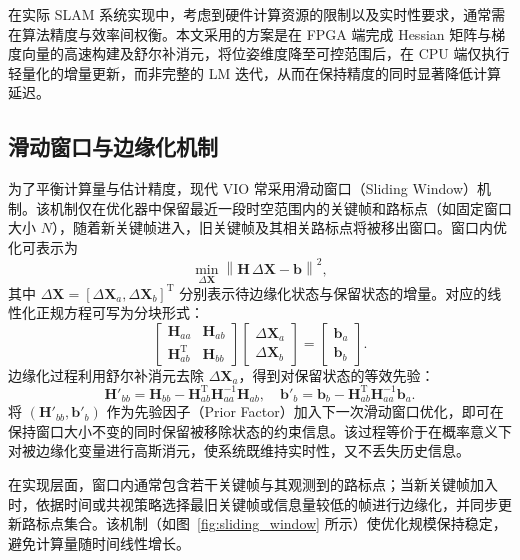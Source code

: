 在实际 SLAM 系统实现中，考虑到硬件计算资源的限制以及实时性要求，通常需在算法精度与效率间权衡。本文采用的方案是在 FPGA 端完成 Hessian 矩阵与梯度向量的高速构建及舒尔补消元，将位姿维度降至可控范围后，在 CPU 端仅执行轻量化的增量更新，而非完整的 LM 迭代，从而在保持精度的同时显著降低计算延迟。

\subsection{滑动窗口与边缘化机制}

为了平衡计算量与估计精度，现代 VIO 常采用滑动窗口（Sliding Window）机制。该机制仅在优化器中保留最近一段时空范围内的关键帧和路标点（如固定窗口大小 $N$），随着新关键帧进入，旧关键帧及其相关路标点将被移出窗口。窗口内优化可表示为
\begin{equation}
\min_{\Delta\mathbf{X}} \left\| \mathbf{H}\,\Delta\mathbf{X} - \mathbf{b} \right\|^2,
\end{equation}
其中 $\Delta\mathbf{X}=[\Delta\mathbf{X}_a,\Delta\mathbf{X}_b]^{\mathrm{T}}$ 分别表示待边缘化状态与保留状态的增量。对应的线性化正规方程可写为分块形式：
\begin{equation}
\begin{bmatrix}
\mathbf{H}_{aa} & \mathbf{H}_{ab} \\
\mathbf{H}_{ab}^{\mathrm{T}} & \mathbf{H}_{bb}
\end{bmatrix}
\begin{bmatrix}
\Delta\mathbf{X}_a \\
\Delta\mathbf{X}_b
\end{bmatrix}
=
\begin{bmatrix}
\mathbf{b}_a \\
\mathbf{b}_b
\end{bmatrix}.
\end{equation}
边缘化过程利用舒尔补消元去除 $\Delta\mathbf{X}_a$，得到对保留状态的等效先验：
\begin{equation}
\mathbf{H}'_{bb} = \mathbf{H}_{bb} - \mathbf{H}_{ab}^{\mathrm{T}}\mathbf{H}_{aa}^{-1}\mathbf{H}_{ab},\quad
\mathbf{b}'_b = \mathbf{b}_b - \mathbf{H}_{ab}^{\mathrm{T}}\mathbf{H}_{aa}^{-1}\mathbf{b}_a.
\end{equation}
将 $(\mathbf{H}'_{bb},\mathbf{b}'_b)$ 作为先验因子（Prior Factor）加入下一次滑动窗口优化，即可在保持窗口大小不变的同时保留被移除状态的约束信息。该过程等价于在概率意义下对被边缘化变量进行高斯消元，使系统既维持实时性，又不丢失历史信息。

在实现层面，窗口内通常包含若干关键帧与其观测到的路标点；当新关键帧加入时，依据时间或共视策略选择最旧关键帧或信息量较低的帧进行边缘化，并同步更新路标点集合。该机制（如图~\ref{fig:sliding_window} 所示）使优化规模保持稳定，避免计算量随时间线性增长。

